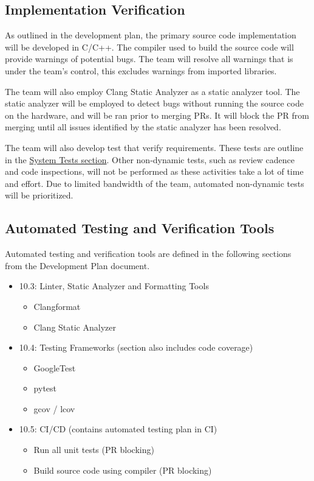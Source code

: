 \documentclass[12pt, titlepage]{article}
\begin{document}
\subsection{Implementation Verification}\label{sec:implementation_verification}

As outlined in the development plan, the primary source code implementation will
be developed in C/C++. The compiler used to build the source code will provide
warnings of potential bugs. The team will resolve all warnings that is under the
team's control, this excludes warnings from imported libraries. \newline

The team will also employ Clang Static Analyzer \cite{clangStaticAnalyzer} as a
static analyzer tool. The static analyzer will be employed to detect bugs
without running the source code on the hardware, and will be ran prior to
merging PRs. It will block the PR from merging until all issues identified by
the static analyzer has been resolved.

The team will also develop test that verify requirements. These tests are
outline in the \hyperref[sec:system_tests]{System Tests section}. Other
non-dynamic tests, such as review cadence and code inspections, will not be
performed as these activities take a lot of time and effort. Due to limited
bandwidth of the team, automated non-dynamic tests will be prioritized. 

\subsection{Automated Testing and Verification Tools}
\label{sec:testing_tools}

Automated testing and verification tools are defined in the following sections
from the Development Plan document.

\begin{itemize}
  \item 10.3: Linter, Static Analyzer and Formatting Tools
  \begin{itemize}
    \item Clangformat \cite{ClangFormat}
    \item Clang Static Analyzer \cite{clangStaticAnalyzer}
  \end{itemize}
  \item 10.4: Testing Frameworks (section also includes code coverage)
  \begin{itemize}
    \item GoogleTest \cite{GoogleTest}
    \item pytest \cite{pytest}
    \item gcov \cite{gcov} / lcov \cite{lcov}
  \end{itemize}
  \item 10.5: CI/CD (contains automated testing plan in CI)
  \begin{itemize}
    \item Run all unit tests (PR blocking)
    \item Build source code using compiler (PR blocking)
  \end{itemize}
\end{itemize}
\end{document}
